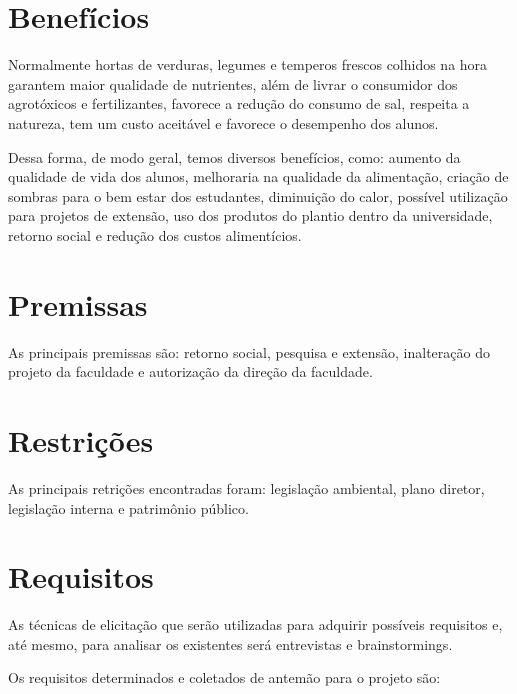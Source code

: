\section{Benefícios}

  Normalmente hortas de verduras, legumes e temperos frescos colhidos na hora garantem maior qualidade de nutrientes, além de livrar o
  consumidor dos agrotóxicos e fertilizantes, favorece a redução do consumo de sal, respeita a natureza, tem um custo aceitável e
  favorece o desempenho dos alunos.

  Dessa forma, de modo geral, temos diversos benefícios, como: aumento da qualidade de vida dos alunos, melhoraria na qualidade da alimentação, criação de sombras para o bem estar dos estudantes, diminuição do calor, possível utilização para projetos de extensão, uso dos produtos do plantio dentro da universidade, retorno social e redução dos custos alimentícios.

\section{Premissas}

  As principais premissas são: retorno social, pesquisa e extensão, inalteração do projeto da faculdade e autorização da direção da faculdade.

\section{Restrições}

  As principais retrições encontradas foram: legislação ambiental, plano diretor, legislação interna e patrim\^{o}nio público.

\section{Requisitos}

  As técnicas de elicitação que serão utilizadas para adquirir possíveis requisitos e, até mesmo, para analisar os existentes será
  entrevistas e brainstormings.

  Os requisitos determinados e coletados de antemão para o projeto são:

